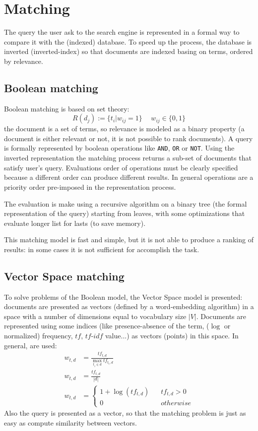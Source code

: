 \documentclass[11pt, a4page]{article}
\begin{document}
\section{Matching}
The query the user ask to the search engine is represented in a formal way to compare it with the (indexed) database.
To speed up the process, the database is inverted (inverted-index) so that documents are indexed basing on terms, ordered by relevance.

\subsection{Boolean matching}
Boolean matching is based on set theory:
\begin{equation*}
  R(d_j) := \{t_i | w_{ij} = 1\} \hspace{15pt} w_{ij} \in \{0, 1\}
\end{equation*}
the document is a set of terms, so relevance is modeled as a binary property (a document is either relevant or not, it is not possible to rank documents).
A query is formally represented by boolean operations like \verb|AND|, \verb|OR| or \verb|NOT|.
Using the inverted representation the matching process returns a sub-set of documents that satisfy user's query.
Evaluations order of operations must be clearly specified because a different order can produce different results.
In general operations are a priority order pre-imposed in the representation process.

The evaluation is make using a recursive algorithm on a binary tree (the formal representation of the query) starting from leaves, with some optimizations that evaluate longer list for lasts (to save memory).

This matching model is fast and simple, but it is not able to produce a ranking of results: in some cases it is not sufficient for accomplish the task.

\subsection{Vector Space matching}
To solve problems of the Boolean model, the Vector Space model is presented: documents  are presented as vectors (defined by a word-embedding algorithm) in a space with a number of dimensions equal to vocabulary size $|V|$.
Documents are represented using some indices (like presence-absence of the term, ($\log$ or normalized) frequency, $tf$, $tf\text{-}idf$ value...) as vectors (points) in this space.
In general, are used:
\begin{align*}
  w_{t, d} &= \frac{tf_{t,d}}{\displaystyle \max_{t_i \in d} tf_{t_i, d}} \\
  w_{t, d} &= \frac{tf_{t, d}}{|d|} \\
  w_{t, d} &= \begin{cases}
    1 + \log(tf_{t, d}) \hspace{10pt} &tf_{t, d} > 0 \\
    0 & otherwise
    \end{cases}
\end{align*}
Also the query is presented as a vector, so that the matching problem is just as easy as compute similarity between vectors.
\end{document}
